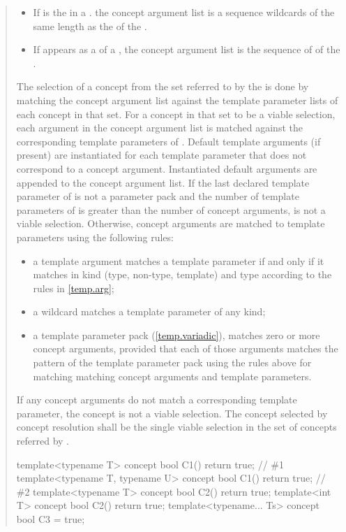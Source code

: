 \begin{quote}
\begin{itemize}
\item If  is the  in a
. the concept argument list is a sequence 
wildcards of the same length as the  of
the .

\item If  appears as a  of a
, the concept argument list is the sequence of
 of the .
\end{itemize}


\pnum
The selection of a concept from the set referred to by the 
  is done by matching the
concept argument list against the template parameter lists of each
concept in that set.
% 
For a concept  in that set to be a viable selection, each 
argument in the concept argument list is matched against the corresponding 
template parameters of .
% 
Default template arguments (if present) are instantiated for each template 
parameter that does not correspond to a concept argument. Instantiated
default arguments are appended to the concept argument list.
% 
If the last declared template parameter of  is not a parameter pack
and the number of template parameters of  is greater than the
number of concept arguments,  is not a viable selection.
% 
Otherwise, concept arguments are matched to template parameters using the 
following rules:
% 
\begin{itemize}
\item a template argument matches a template parameter if and only if
it matches in kind (type, non-type, template) and type according to the
rules in \ref{temp.arg};

\item a wildcard matches a template parameter of any kind;

\item a template parameter pack (\ref{temp.variadic}), matches zero or more 
concept arguments, provided that each of those arguments matches the pattern 
of the template parameter pack using the rules above for matching matching 
concept arguments and template parameters.
\end{itemize}
% 
If any concept arguments do not match a corresponding template parameter,
the concept  is not a viable selection.
% 
The concept selected by concept resolution shall be the single viable selection
in the set of concepts referred by .
% 
\enterexample
\begin{codeblock}
template<typename T> concept bool C1() { return true; }             // \#1
template<typename T, typename U> concept bool C1() { return true; } // \#2
template<typename T> concept bool C2() { return true; }
template<int T> concept bool C2() { return true; }
template<typename... Ts> concept bool C3 = true;


\end{codeblock}
\end{quote}
